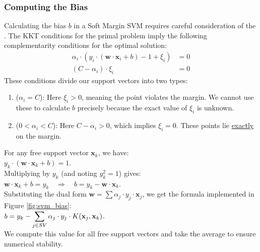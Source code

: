 \subsubsection{Computing the Bias}
Calculating the bias $b$ in a Soft Margin SVM requires careful consideration of the
.
The KKT conditions for the primal problem imply the following complementarity conditions for the optimal solution:
\begin{align*}
    \alpha_i \cdot (y_i \cdot(\mathbf{w} \cdot \mathbf{x}_i + b) - 1 + \xi_i) &= 0 \\
    (C - \alpha_i) \cdot \xi_i &= 0
\end{align*}
These conditions divide our support vectors into two types:
\begin{enumerate}
\item {} ($\alpha_i = C$):
       Here $\xi_i > 0$, meaning the point violates the margin. We cannot use these to calculate $b$ precisely
       because the exact value of $\xi_i$ is unknown. 
 \item {} ($0 < \alpha_i < C$):
       Here $C - \alpha_i > 0$, which implies $\xi_i = 0$. These points lie \underline{exactly} on the margin.
\end{enumerate}
For any free support vector $\mathbf{x}_k$, we have:
\\[0.2cm]
\hspace*{1.3cm}
$y_k \cdot (\mathbf{w} \cdot \mathbf{x}_k + b) = 1$.
\\[0.2cm]
Multiplying by $y_k$ (and noting $y_k^2=1$) gives:
\\[0.2cm]
\hspace*{1.3cm}
$\mathbf{w} \cdot \mathbf{x}_k + b = y_k \quad \Rightarrow \quad b = y_k - \mathbf{w} \cdot \mathbf{x}_k$.
\\[0.2cm]
Substituting the dual form $\mathbf{w} = \sum \alpha_j \cdot y_j \cdot \mathbf{x}_j$,
we get the formula implemented in Figure \ref{fig:svm_bias}:
\\[0.2cm]
\hspace*{1.3cm}
$\displaystyle b = y_k - \sum_{j \in SV} \alpha_j \cdot y_j \cdot K(\mathbf{x}_j, \mathbf{x}_k)$.
\\[0.2cm]
We compute this value for all free support vectors and take the average to ensure numerical stability.

